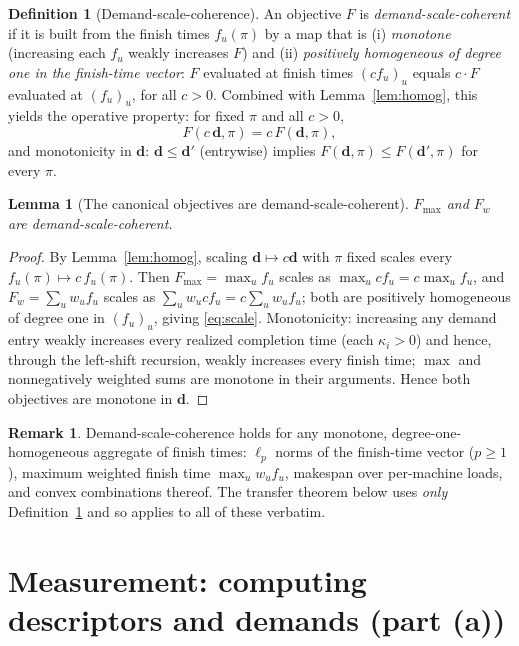 \documentclass{amsart}
\newtheorem{lemma}{Lemma}
\theoremstyle{definition}
\newtheorem{definition}{Definition}
\newtheorem{remark}{Remark}
\begin{document}
\begin{definition}[Demand-scale-coherence]\label{def:coherent}
An objective $F$ is \emph{demand-scale-coherent} if it is built from the finish
times $f_u(\pi)$ by a map that is (i) \emph{monotone} (increasing each $f_u$
weakly increases $F$) and (ii) \emph{positively homogeneous of degree one in the
finish-time vector}: $F$ evaluated at finish times $(c f_u)_u$ equals
$c\cdot F$ evaluated at $(f_u)_u$, for all $c>0$. Combined with
Lemma~\ref{lem:homog}, this yields the operative property: for fixed $\pi$ and
all $c>0$,
\begin{equation}\label{eq:scale}
F(c\,\mathbf d,\pi)=c\,F(\mathbf d,\pi),
\end{equation}
and monotonicity in $\mathbf d$: $\mathbf d\le\mathbf d'$ (entrywise) implies
$F(\mathbf d,\pi)\le F(\mathbf d',\pi)$ for every $\pi$.
\end{definition}

\begin{lemma}[The canonical objectives are demand-scale-coherent]\label{lem:canonical}
$F_{\max}$ and $F_w$ are demand-scale-coherent.
\end{lemma}

\begin{proof}
By Lemma~\ref{lem:homog}, scaling $\mathbf d\mapsto c\mathbf d$ with $\pi$ fixed
scales every $f_u(\pi)\mapsto c\,f_u(\pi)$. Then
$F_{\max}=\max_u f_u$ scales as $\max_u c f_u=c\max_u f_u$, and
$F_w=\sum_u w_u f_u$ scales as $\sum_u w_u c f_u=c\sum_u w_u f_u$; both are
positively homogeneous of degree one in $(f_u)_u$, giving \eqref{eq:scale}.
Monotonicity: increasing any demand entry weakly increases every realized
completion time (each $\kappa_i>0$) and hence, through the left-shift
recursion, weakly increases every finish time; $\max$ and nonnegatively
weighted sums are monotone in their arguments. Hence both objectives are
monotone in $\mathbf d$.
\end{proof}

\begin{remark}\label{rem:classes}
Demand-scale-coherence holds for any monotone, degree-one-homogeneous aggregate
of finish times: $\ell_p$ norms of the finish-time vector ($p\ge1$), maximum
weighted finish time $\max_u w_u f_u$, makespan over per-machine loads, and
convex combinations thereof. The transfer theorem below uses \emph{only}
Definition~\ref{def:coherent} and so applies to all of these verbatim.
\end{remark}

\section{Measurement: computing descriptors and demands (part (a))}\label{sec:measure}
\end{document}
